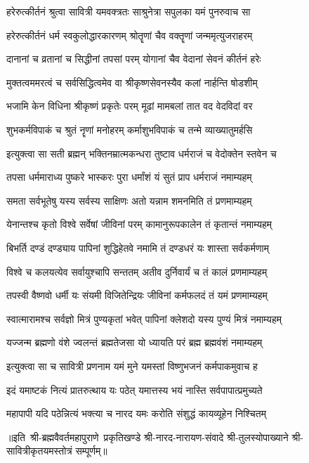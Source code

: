 

\twolineshloka
{हरेरुत्कीर्तनं श्रुत्वा सावित्री यमवक्त्रतः}
{साश्रुनेत्रा सपुलका यमं पुनरुवाच सा}%

\twolineshloka
{हरेरुत्कीर्तनं धर्म स्वकुलोद्धारकारणम्}
{श्रोतॄणां चैव वक्तॄणां जन्ममृत्युजराहरम्}%

\twolineshloka
{दानानां च व्रतानां च सिद्धीनां तपसां परम्}
{योगानां चैव वेदानां सेवनं कीर्तनं हरेः}%

\twolineshloka
{मुक्तत्वममरत्वं च सर्वसिद्धित्वमेव वा}
{श्रीकृष्णसेवनस्यैव कलां नार्हन्ति षोडशीम्}%

\twolineshloka
{भजामि केन विधिना श्रीकृष्णं प्रकृतेः परम्}
{मूढां मामबलां तात वद वेदविदां वर}%

\twolineshloka
{शुभकर्मविपाकं च श्रुतं नॄणां मनोहरम्}
{कर्माशुभविपाकं च तन्मे व्याख्यातुमर्हसि}%

\twolineshloka
{इत्युक्त्वा सा सती ब्रह्मन् भक्तिनम्रात्मकन्धरा}
{तुष्टाव धर्मराजं च वेदोक्तेन स्तवेन च}%

\twolineshloka
{तपसा धर्ममाराध्य पुष्करे भास्करः पुरा}
{धर्मांशं यं सुतं प्राप धर्मराजं नमाम्यहम्}%

\twolineshloka
{समता सर्वभूतेषु यस्य सर्वस्य साक्षिणः}
{अतो यन्नाम शमनमिति तं प्रणमाम्यहम्}%

\twolineshloka
{येनान्तश्च कृतो विश्वे सर्वेषां जीविनां परम्}
{कामानुरूपकालेन तं कृतान्तं नमाम्यहम्}%

\twolineshloka
{बिभर्ति दण्डं दण्ड्याय पापिनां शुद्धिहेतवे}
{नमामि तं दण्डधरं यः शास्ता सर्वकर्मणाम्}%

\twolineshloka
{विश्वे च कलयत्येव सर्वायुश्चापि सन्ततम्}
{अतीव दुर्निवार्यं च तं कालं प्रणमाम्यहम्}%

\twolineshloka
{तपस्वी वैष्णवो धर्मी यः संयमी विजितेन्द्रियः}
{जीविनां कर्मफलदं तं यमं प्रणमाम्यहम्}%

\twolineshloka
{स्वात्मारामश्च सर्वज्ञो मित्रं पुण्यकृतां भवेत्}
{पापिनां क्लेशदो यस्य पुण्यं मित्रं नमाम्यहम्}%

\twolineshloka
{यज्जन्म ब्रह्मणो वंशे ज्वलन्तं ब्रह्मतेजसा}
{यो ध्यायति परं ब्रह्म ब्रह्मवंशं नमाम्यहम्}%

\twolineshloka
{इत्युक्त्वा सा च सावित्री प्रणनाम यमं मुने}
{यमस्तां विष्णुभजनं कर्मपाकमुवाच ह}%

\twolineshloka
{इदं यमाष्टकं नित्यं प्रातरुत्थाय यः पठेत्}
{यमात्तस्य भयं नास्ति सर्वपापात्प्रमुच्यते}%

\twolineshloka
{महापापी यदि पठेन्नित्यं भक्त्या च नारद}
{यमः करोति संशुद्धं कायव्यूहेन निश्चितम्}%

{॥इति~श्री-ब्रह्मवैवर्तमहापुराणे~प्रकृतिखण्डे श्री-नारद-नारायण-संवादे श्री-तुलस्योपाख्याने श्री-सावित्रीकृतयमस्तोत्रं सम्पूर्णम्॥}